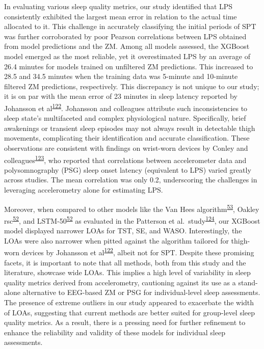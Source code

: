 \documentclass[
  9pt,
]{scrbook}
\begin{document}
In evaluating various sleep quality metrics, our study identified that
LPS consistently exhibited the largest mean error in relation to the
actual time allocated to it. This challenge in accurately classifying
the initial periods of SPT was further corroborated by poor Pearson
correlations between LPS obtained from model predictions and the ZM.
Among all models assessed, the XGBoost model emerged as the most
reliable, yet it overestimated LPS by an average of 26.4 minutes for
models trained on unfiltered ZM predictions. This increased to 28.5 and
34.5 minutes when the training data was 5-minute and 10-minute filtered
ZM predictions, respectively. This discrepancy is not unique to our
study; it is on par with the mean error of 23 minutes in sleep latency
reported by Johansson et
al\textsuperscript{\protect\hyperlink{ref-johansson_development_2023}{122}}.
Johansson and colleagues attribute such inconsistencies to sleep state's
multifaceted and complex physiological nature. Specifically, brief
awakenings or transient sleep episodes may not always result in
detectable thigh movements, complicating their identification and
accurate classification. These observations are consistent with findings
on wrist-worn devices by Conley and
colleagues\textsuperscript{\protect\hyperlink{ref-conley_agreement_2019}{123}},
who reported that correlations between accelerometer data and
polysomnography (PSG) sleep onset latency (equivalent to LPS) varied
greatly across studies. The mean correlation was only 0.2, underscoring
the challenges in leveraging accelerometry alone for estimating LPS.

Moreover, when compared to other models like the Van Hees
algorithm\textsuperscript{\protect\hyperlink{ref-hees_novel_2015}{53}},
Oakley
rsc\textsuperscript{\protect\hyperlink{ref-palotti_benchmark_2019}{52}},
and
LSTM-50\textsuperscript{\protect\hyperlink{ref-palotti_benchmark_2019}{52}}
as evaluated in the Patterson et
al.~study\textsuperscript{\protect\hyperlink{ref-patterson_40_2023}{124}},
our XGBoost model displayed narrower LOAs for TST, SE, and WASO.
Interestingly, the LOAs were also narrower when pitted against the
algorithm tailored for thigh-worn devices by Johansson et
al\textsuperscript{\protect\hyperlink{ref-johansson_development_2023}{122}},
albeit not for SPT. Despite these promising facets, it is important to
note that all methods, both from this study and the literature, showcase
wide LOAs. This implies a high level of variability in sleep quality
metrics derived from accelerometry, cautioning against its use as a
stand-alone alternative to EEG-based ZM or PSG for individual-level
sleep assessments. The presence of extreme outliers in our study
appeared to exacerbate the width of LOAs, suggesting that current
methods are better suited for group-level sleep quality metrics. As a
result, there is a pressing need for further refinement to enhance the
reliability and validity of these models for individual sleep
assessments.
\end{document}
